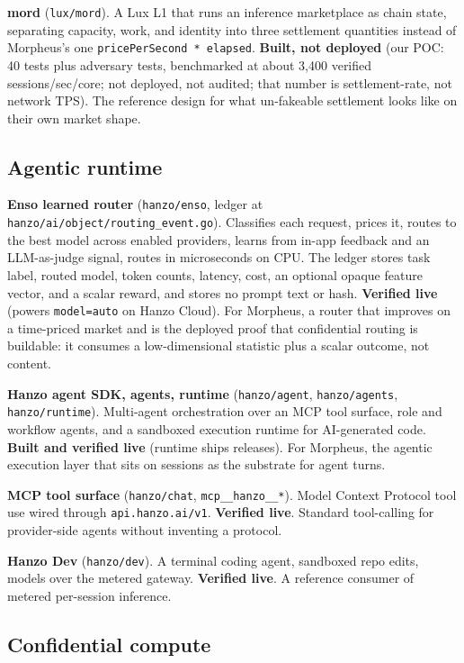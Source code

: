 \documentclass[11pt,a4paper]{article}
\newcommand{\code}[1]{\texttt{\small #1}}
\begin{document}
\textbf{mord} (\code{lux/mord}). A Lux L1 that runs an inference marketplace as chain state,
separating capacity, work, and identity into three settlement quantities instead of Morpheus's
one \code{pricePerSecond * elapsed}. \textbf{Built, not deployed} (our POC: 40 tests plus
adversary tests, benchmarked at about 3,400 verified sessions/sec/core; not deployed, not
audited; that number is settlement-rate, not network TPS). The reference design for what
un-fakeable settlement looks like on their own market shape.

\subsection{Agentic runtime}

\textbf{Enso learned router} (\code{hanzo/enso}, ledger at
\code{hanzo/ai/object/routing\_event.go}). Classifies each request, prices it, routes to the
best model across enabled providers, learns from in-app feedback and an LLM-as-judge signal,
routes in microseconds on CPU. The ledger stores task label, routed model, token counts,
latency, cost, an optional opaque feature vector, and a scalar reward, and stores no prompt text
or hash. \textbf{Verified live} (powers \code{model=auto} on Hanzo Cloud). For Morpheus, a
router that improves on a time-priced market and is the deployed proof that confidential routing
is buildable: it consumes a low-dimensional statistic plus a scalar outcome, not content.

\textbf{Hanzo agent SDK, agents, runtime} (\code{hanzo/agent}, \code{hanzo/agents},
\code{hanzo/runtime}). Multi-agent orchestration over an MCP tool surface, role and workflow
agents, and a sandboxed execution runtime for AI-generated code. \textbf{Built and verified
live} (runtime ships releases). For Morpheus, the agentic execution layer that sits on sessions
as the substrate for agent turns.

\textbf{MCP tool surface} (\code{hanzo/chat}, \code{mcp\_\_hanzo\_\_*}). Model Context Protocol
tool use wired through \code{api.hanzo.ai/v1}. \textbf{Verified live}. Standard tool-calling for
provider-side agents without inventing a protocol.

\textbf{Hanzo Dev} (\code{hanzo/dev}). A terminal coding agent, sandboxed repo edits, models
over the metered gateway. \textbf{Verified live}. A reference consumer of metered per-session
inference.

\subsection{Confidential compute}
\end{document}
